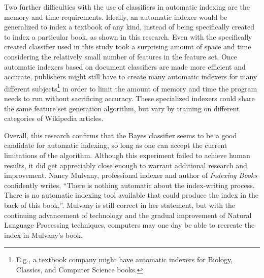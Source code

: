 Two further difficulties with the use of classifiers in automatic indexing are the memory and time requirements.
Ideally, an automatic indexer would be generalized to index a textbook of any kind, instead of being specifically created to index a particular book, as shown in this research.
Even with the specifically created classifier used in this study took a surprising amount of space and time considering the relatively small number of features in the feature set.
Once automatic indexers based on document classifiers are made more efficient and accurate, publishers might still have to create many automatic indexers for many different subjects\footnote{E.g., a textbook company might have automatic indexers for Biology, Classics, and Computer Science books.} in order to limit the amount of memory and time the program needs to run without sacrificing accuracy.
These specialized indexers could share the same feature set generation algorithm, but vary by training on different categories of Wikipedia articles.

Overall, this research confirms that the \naive Bayes classifier seems to be a good candidate for automatic indexing, so long as one can accept the current limitations of the algorithm.
Although this experiment failed to achieve human results, it did get appreciably close enough to warrant additional research and improvement.
Nancy Mulvany, professional indexer and author of {\it Indexing Books} confidently writes, ``There is nothing automatic about the index-writing process.
There is no automatic indexing tool available that could produce the index in the back of this book,''\cite{mulvany}.
Mulvany is still correct in her statement, but with the continuing advancement of technology and the gradual improvement of Natural Language Processing techniques, computers may one day be able to recreate the index in Mulvany's book.